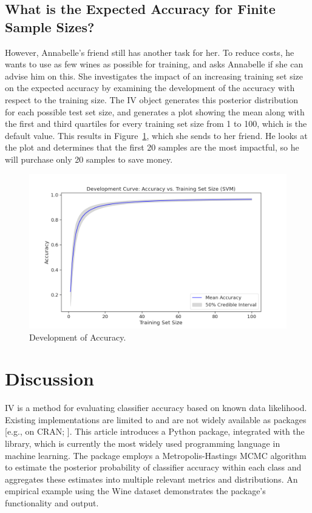 \documentclass[man]{apa7}
\begin{document}
\subsection{What is the Expected Accuracy for Finite Sample Sizes?} \label{sec:ex_finite_samples}

However, Annabelle’s friend still has another task for her.
To reduce costs, he wants to use as few wines as possible for training, and asks Annabelle if she can advise him on this.
She investigates the impact of an increasing training set size on the expected accuracy by examining the development of the accuracy with respect to the training size.
The IV object generates this posterior distribution for each possible test set size, and generates a plot showing the mean along with the first and third quartiles for every training set size from 1 to 100, which is the default value.
This results in Figure~\ref{fig:development}, which she sends to her friend.
He looks at the plot and determines that the first 20 samples are the most impactful, so he will purchase only 20 samples to save money.

\begin{figure}[t!]
\centering
\includegraphics{plots/figure4.png}
\caption{Development of Accuracy. \label{fig:development}}
\end{figure}

\section{Discussion} \label{sec:discussion}
IV is a method for evaluating classifier accuracy based on known data likelihood. Existing implementations are limited to  and are not widely available as packages [e.g., on CRAN; \citep{braun_independent_2023}]. This article introduces a Python package, integrated with the  library, which is currently the most widely used programming language in machine learning. The package employs a Metropolis-Hastings MCMC algorithm to estimate the posterior probability of classifier accuracy within each class and aggregates these estimates into multiple relevant metrics and distributions. An empirical example using the Wine dataset \citep{aeberhard1994comparative} demonstrates the package’s functionality and output.
\end{document}
